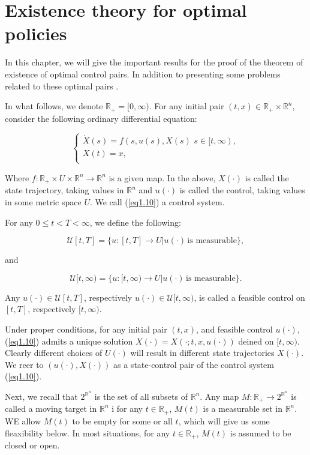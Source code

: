\chapter{Existence theory for optimal policies}
In this chapter, we will give the important results for the proof of the theorem of existence of optimal control pairs. In addition to presenting some problems related to these optimal pairs \cite{Yong2015}.

In what follows, we denote $\mathbb{R}_{+}=[0,\infty)$. For any initial pair $(t,x)\in \mathbb{R}_{+}\times \mathbb{R}^n$, consider the following ordinary differential equation:

\begin{equation}\label{eq1.10}
\left\{ \begin{array}{l}
\dot{X}(s)=f(s,u(s),X(s)\,\,s\in [t,\infty), \\
X(t)=x,\\
\end{array}
\right.
\end{equation}

Where $f:\mathbb{R}_{+}\times U\times \mathbb{R}^n\rightarrow \mathbb{R}^n$ is a given map. In the above, $X(\cdot)$ is called the state trajectory, taking values in $\mathbb{R}^n$ and $u(\cdot)$ is called the control, taking values in some metric space $U$. We call (\ref{eq1.10}) a control system.

For any $0\leq t<T<\infty$, we define the following:

$$\mathcal{U}[t,T]=\{u:[t,T]\rightarrow U | u(\cdot)\,\mbox{is measurable} \},$$

and 


$$\mathcal{U}[t,\infty)=\{u:[t,\infty)\rightarrow U | u(\cdot)\,\mbox{is measurable} \}.$$

Any $u(\cdot)\in \mathcal{U}[t,T]$, respectively $u(\cdot)\in \mathcal{U}[t,\infty)$, is called a feasible control on $[t,T]$, respectively $[t,\infty)$. 

Under proper conditions, for any initial pair $(t,x)$, and feasible control $u(\cdot)$, (\ref{eq1.10}) admits a unique solution $X(\cdot)=X(\cdot;t,x,u(\cdot))$ deined on $[t,\infty)$. Clearly different choices of $U(\cdot)$ will result in different state trajectories $X(\cdot)$. We reer to $(u(\cdot),X(\cdot))$ as a state-control pair of the control system (\ref{eq1.10}).

Next, we recall that $2^{\mathbb{R}^n}$ is the set of all subsets of $\mathbb{R}^n$. Any map $M:\mathbb{R}_{+}\rightarrow 2^{\mathbb{R}^n}$ is called a moving target in $\mathbb{R}^n$ i for any $t\in \mathbb{R}_{+}$, $M(t)$ is a measurable set in $\mathbb{R}^n$. WE allow $M(t)$ to be empty for some or all $t$, which will give us some fleaxibility below. In most situations, for any $t\in\mathbb{R}_{+}$, $M(t)$ is assumed to be closed or open.

